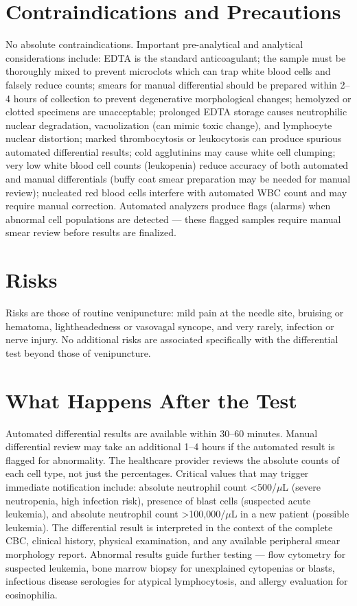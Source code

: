 \section*{Contraindications and Precautions}
No absolute contraindications. Important pre-analytical and analytical considerations include: EDTA is the standard anticoagulant; the sample must be thoroughly mixed to prevent microclots which can trap white blood cells and falsely reduce counts; smears for manual differential should be prepared within 2--4 hours of collection to prevent degenerative morphological changes; hemolyzed or clotted specimens are unacceptable; prolonged EDTA storage causes neutrophilic nuclear degradation, vacuolization (can mimic toxic change), and lymphocyte nuclear distortion; marked thrombocytosis or leukocytosis can produce spurious automated differential results; cold agglutinins may cause white cell clumping; very low white blood cell counts (leukopenia) reduce accuracy of both automated and manual differentials (buffy coat smear preparation may be needed for manual review); nucleated red blood cells interfere with automated WBC count and may require manual correction. Automated analyzers produce flags (alarms) when abnormal cell populations are detected --- these flagged samples require manual smear review before results are finalized.

\section*{Risks}
Risks are those of routine venipuncture: mild pain at the needle site, bruising or hematoma, lightheadedness or vasovagal syncope, and very rarely, infection or nerve injury. No additional risks are associated specifically with the differential test beyond those of venipuncture.

\section*{What Happens After the Test}
Automated differential results are available within 30--60 minutes. Manual differential review may take an additional 1--4 hours if the automated result is flagged for abnormality. The healthcare provider reviews the absolute counts of each cell type, not just the percentages. Critical values that may trigger immediate notification include: absolute neutrophil count <500/$\mu$L (severe neutropenia, high infection risk), presence of blast cells (suspected acute leukemia), and absolute neutrophil count >100,000/$\mu$L in a new patient (possible leukemia). The differential result is interpreted in the context of the complete CBC, clinical history, physical examination, and any available peripheral smear morphology report. Abnormal results guide further testing --- flow cytometry for suspected leukemia, bone marrow biopsy for unexplained cytopenias or blasts, infectious disease serologies for atypical lymphocytosis, and allergy evaluation for eosinophilia.

